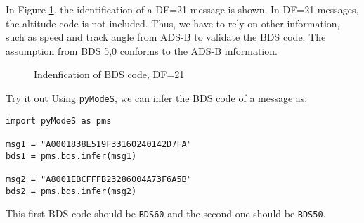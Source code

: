 In Figure \ref{fig:bds_bds_infer_example_2}, the identification of a DF=21 message is shown. In DF=21 messages, the altitude code is not included. Thus, we have to rely on other information, such as speed and track angle from ADS-B to validate the BDS code. The assumption from BDS 5,0 conforms to the ADS-B information.

\begin{figure}[ht]
\centering

\caption{Indenfication of BDS code, DF=21}
\label{fig:bds_bds_infer_example_2}
\end{figure}

\begin{notebox}{Try it out}
Using \texttt{pyModeS}, we can infer the BDS code of a message as: 

\begin{verbatim}
import pyModeS as pms

msg1 = "A0001838E519F33160240142D7FA"
bds1 = pms.bds.infer(msg1)

msg2 = "A8001EBCFFFB23286004A73F6A5B"
bds2 = pms.bds.infer(msg2)
\end{verbatim}

This first BDS code should be \texttt{BDS60} and the second one should be \texttt{BDS50}.

\end{notebox}
